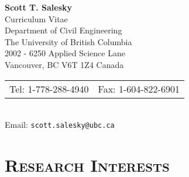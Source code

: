 \documentclass[11pt,letterpaper]{article}
\begin{document}

\pagestyle{empty}           %
\pagestyle{fancy}
\fancyfoot{}                        %
\fancyhead{}                        %
\renewcommand{\headrulewidth}{0pt}

% 

\begin{center}
    \textbf{\Large Scott T. Salesky} \\
    {\Large{Curriculum Vitae}} \\ \smallskip
    Department of Civil Engineering \\
    The University of British Columbia \\
    2002 - 6250 Applied Science Lane \\
    Vancouver, BC V6T 1Z4 Canada \\
    \begin{tabular}{c c}
        Tel: 1-778-288-4940 & Fax: 1-604-822-6901
    \end{tabular} \\
    Email: \texttt{scott.salesky@ubc.ca} %
\end{center}

\section*{\textsc{Research Interests}} 
\end{document}

